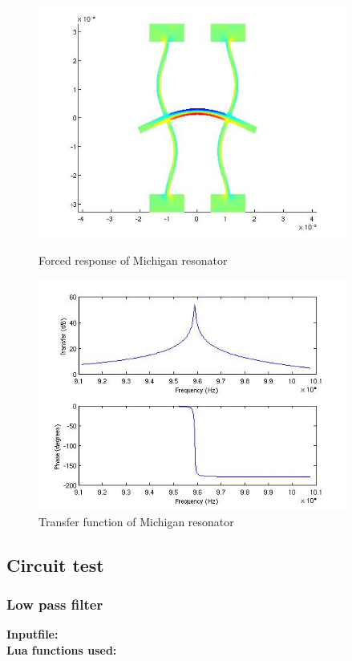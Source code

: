 \begin{figure}[htbp]
\centering
\includegraphics[height = 3in]{fig/mich_resonator_forced.jpg}
\caption{Forced response of Michigan resonator}
\label{fig:MichResonatorForced}
\includegraphics[height = 3in]{fig/mich_resonator_transfer.jpg}
\caption{Transfer function  of Michigan resonator}
\label{fig:MichResonatorTransfer}
\end{figure}

\clearpage
\subsection{Circuit test}
\subsubsection{Low pass filter}
\begin{flushleft}
  \textbf{Inputfile:}
  \\
  \textbf{Lua functions used:}
\end{flushleft}

